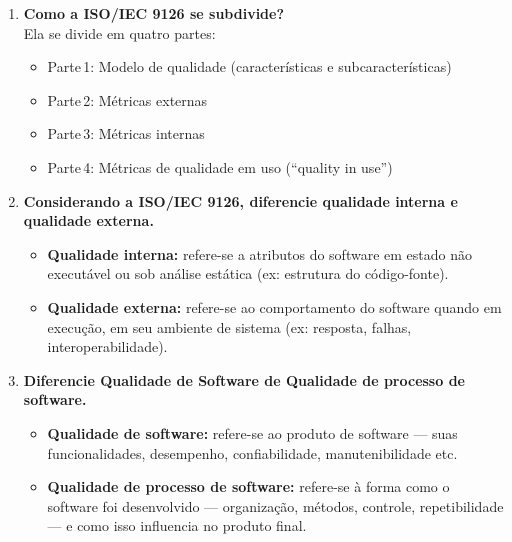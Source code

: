 \documentclass[12pt]{article}
\begin{document}
\begin{enumerate}[label=\textbf{\arabic*.}]
  \item \textbf{Como a \textsc{ISO/IEC} 9126 se subdivide?} \\
    Ela se divide em quatro partes: \\
    \begin{itemize}
      \item Parte\,1: Modelo de qualidade (características e subcaracterísticas) \\
      \item Parte\,2: Métricas externas \\
      \item Parte\,3: Métricas internas \\
      \item Parte\,4: Métricas de qualidade em uso (“quality in use”)
    \end{itemize}

  \item \textbf{Considerando a \textsc{ISO/IEC} 9126, diferencie qualidade interna e qualidade externa.} \\
    \begin{itemize}
      \item \textbf{Qualidade interna:} refere-se a atributos do software em estado não executável ou sob análise estática (ex: estrutura do código-fonte). \\
      \item \textbf{Qualidade externa:} refere-se ao comportamento do software quando em execução, em seu ambiente de sistema (ex: resposta, falhas, interoperabilidade).
    \end{itemize}

  \item \textbf{Diferencie Qualidade de Software de Qualidade de processo de software.} \\
    \begin{itemize}
      \item \textbf{Qualidade de software:} refere-se ao produto de software — suas funcionalidades, desempenho, confiabilidade, manutenibilidade etc. \\
      \item \textbf{Qualidade de processo de software:} refere-se à forma como o software foi desenvolvido — organização, métodos, controle, repetibilidade — e como isso influencia no produto final.
    \end{itemize}


\end{enumerate}
\end{document}
